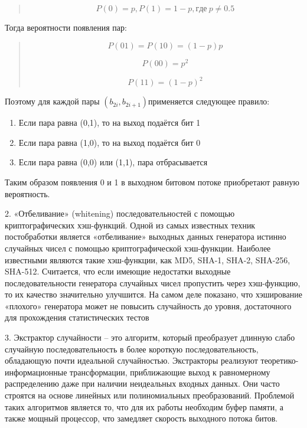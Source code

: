 \begin{quote}
\[P(0) = p,P(1) = 1 - p,где\ p \neq 0.5\]
\end{quote}

Тогда вероятности появления пар:

\begin{quote}
\[P(01) = P(10) = (1 - p)p\]

\[P(00) = p^{2}\]

\[P(11) = (1 - p)^{2}\]
\end{quote}

Поэтому для каждой пары \(\left( b_{2i},b_{2i + 1} \right)\)применяется
следующее правило:

\begin{enumerate}
\def\labelenumi{\arabic{enumi}.}
\item
  Если пара равна (0,1), то на выход подаётся бит 1
\item
  Если пара равна (1,0), то на выход подаётся бит 0
\item
  Если пара равна (0,0) или (1,1), пара отбрасывается
\end{enumerate}

Таким образом появления 0 и 1 в выходном битовом потоке приобретают
равную вероятность.

2. «Отбеливание» (whitening) последовательностей с помощью
криптографических хэш-функций. Одной из самых известных техник
постобработки является «отбеливание» выходных данных генератора истинно
случайных чисел с помощью криптографической хэш-функции. Наиболее
известными являются такие хэш-функции, как MD5, SHA-1, SHA-2, SHA-256,
SHA-512. Считается, что если имеющие недостатки выходные
последовательности генератора случайных чисел пропустить через
хэш-функцию, то их качество значительно улучшится. На самом деле
показано, что хэширование «плохого» генератора может не повысить
случайность до уровня, достаточного для прохождения статистических
тестов

3. Экстрактор случайности -- это алгоритм, который преобразует длинную
слабо случайную последовательность в более короткую последовательность,
обладающую почти идеальной случайностью. Экстракторы реализуют
теоретико-информационные трансформации, приближающие выход к
равномерному распределению даже при наличии неидеальных входных данных.
Они часто строятся на основе линейных или полиномиальных преобразований.
Проблемой таких алгоритмов является то, что для их работы необходим
буфер памяти, а также мощный процессор, что замедляет скорость выходного
потока битов.


